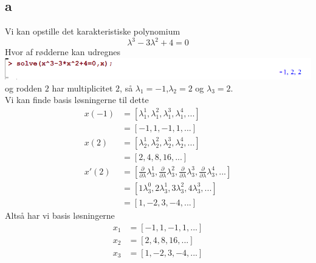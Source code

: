 \documentclass[12pt]{article}
\begin{document}
\subsection{a}
Vi kan opstille det karakteristiske polynomium
$$\lambda^3-3\lambda^2+4=0$$
Hvor af rødderne kan udregnes\\
\includegraphics[width=\textwidth]{1}\\
og rodden $2$ har multiplicitet $2$, så $\lambda_1=-1$,$\lambda_2=2$ og $\lambda_3=2$.\\
Vi kan finde basis løsningerne til dette
\begin{align*}
x(-1)&=[\lambda_1^1,\lambda_1^2,\lambda_1^3,\lambda_1^4,...] \\
&=[-1,1,-1,1,...] \\
x(2)&=[\lambda_2^1,\lambda_2^2,\lambda_2^3,\lambda_2^4,...] \\
&=[2,4,8,16,...] \\
x'(2)&=[\frac{\partial}{\partial\lambda}\lambda_3^1,\frac{\partial}{\partial\lambda}\lambda_3^2,\frac{\partial}{\partial\lambda}\lambda_3^3,\frac{\partial}{\partial\lambda}\lambda_3^4,...] \\
&=[1\lambda_3^0,2\lambda_3^1,3\lambda_3^2,4\lambda_3^3,...] \\
&=[1,-2,3,-4,...]
\end{align*}
Altså har vi basis løsningerne
\begin{align*}
x_1&=[-1,1,-1,1,...] \\
x_2&=[2,4,8,16,...] \\
x_3&=[1,-2,3,-4,...]
\end{align*}
\end{document}
